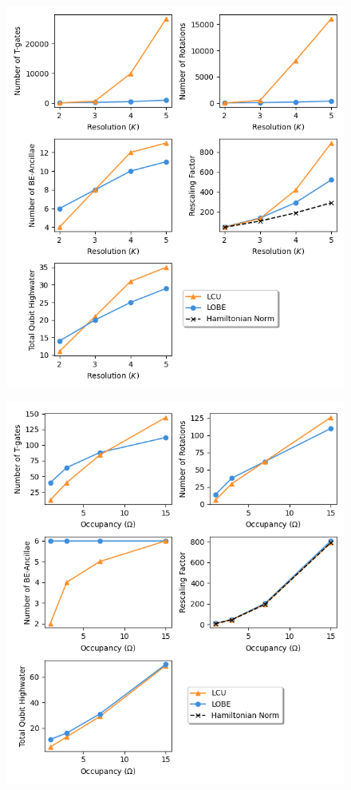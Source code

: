 \begin{figure}[h]
    \centering
    \includegraphics[width = 15cm]{figures/phi4_resolutions.png}
    \caption{}
    \label{}
\end{figure}

\begin{figure}[h]
    \centering
    \includegraphics[width = 15cm]{figures/phi4_occupancies.png}
    \caption{}
    \label{}
\end{figure}